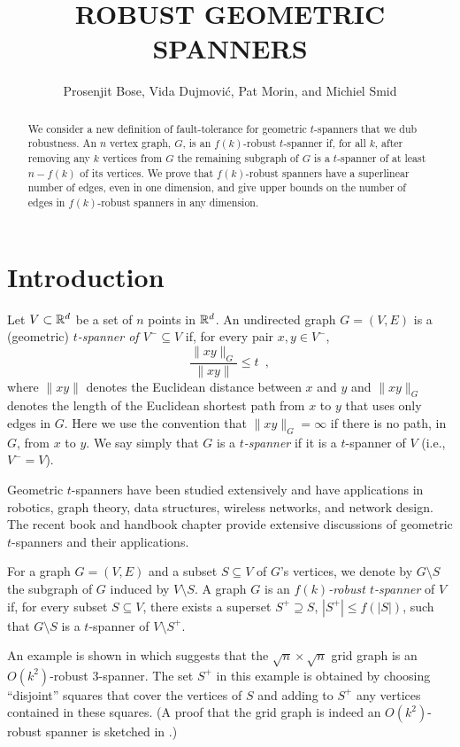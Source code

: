 \documentclass{patmorin}
\title{\MakeUppercase{Robust Geometric Spanners}}
\author{Prosenjit Bose, Vida Dujmovi\'c, Pat Morin, and Michiel Smid}
\begin{document}
\maketitle

\begin{abstract}
  We consider a new definition of fault-tolerance for geometric
  $t$-spanners that we dub robustness.  An $n$ vertex graph, $G$, is
  an $f(k)$-robust $t$-spanner if, for all $k$, after removing any $k$
  vertices from $G$ the remaining subgraph of $G$ is a $t$-spanner
  of at least $n-f(k)$ of its vertices.  We prove that $f(k)$-robust
  spanners have a superlinear number of edges, even in one dimension,
  and give upper bounds on the number of edges in $f(k)$-robust spanners
  in any dimension.
\end{abstract}

\section{Introduction}

Let $V\subset \mathbb{R}^d$ be a set of $n$ points in $\mathbb{R}^d$.  An undirected
graph $G=(V,E)$ is a (geometric) \emph{$t$-spanner of $V^-\subseteq V$}
if, for every pair $x,y\in V^-$,
\[
  \frac{\|xy\|_G}{\|xy\|} \le t \enspace ,
\]
where $\|xy\|$ denotes the Euclidean distance between $x$ and $y$ and
$\|xy\|_G$ denotes the length of the Euclidean shortest path from $x$
to $y$ that uses only edges in $G$.  Here we use the convention that
$\|xy\|_G=\infty$ if there is no path, in $G$, from $x$ to $y$.  We say
simply that $G$ is a \emph{$t$-spanner} if it is a $t$-spanner of $V$
(i.e., $V^-=V$).

Geometric $t$-spanners have been studied extensively and have applications
in robotics, graph theory, data structures, wireless networks, and
network design.  The recent book \cite{ns07} and handbook chapter
\cite{e99} provide extensive discussions of geometric $t$-spanners and
their applications.

For a graph $G=(V,E)$ and a subset $S\subseteq V$ of $G$'s vertices, we
denote by $G\setminus S$ the subgraph of $G$ induced by $V\setminus S$.
A graph $G$ is an \emph{$f(k)$-robust $t$-spanner} of $V$ if, for every
subset $S\subseteq V$, there exists a superset $S^+\supseteq S$, $|S^+|\le
f(|S|)$, such that $G\setminus S$ is a $t$-spanner of $V\setminus S^+$.

An example is shown in  which suggests that the
$\sqrt{n}\times\sqrt{n}$ grid graph is an $O(k^2)$-robust 3-spanner.
The set $S^+$ in this example is obtained by choosing ``disjoint''
squares that cover the vertices of $S$ and adding to $S^+$ any vertices
contained in these squares.  (A proof that the grid graph is indeed an
$O(k^2)$-robust spanner is sketched in .)
\end{document}
